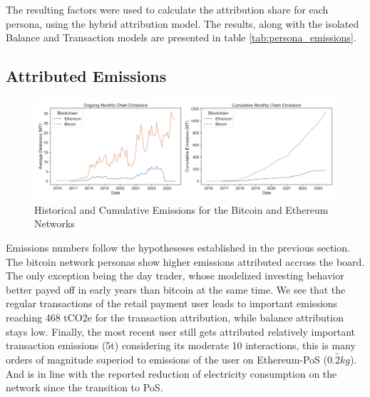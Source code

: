 \documentclass[11pt]{report}
\begin{document}
The resulting factors were used to calculate the attribution share for each persona, using the hybrid attribution model. The results, along with the isolated Balance and Transaction models are presented in table \ref{tab:persona_emissions}.

\subsection{Attributed Emissions}




\begin{figure}[h!]
    \centering
    \centerline{\includegraphics[scale=0.4]{figures/ongoing_cumulative_emissions.png}}
    \caption{Historical and Cumulative Emissions for the Bitcoin and Ethereum Networks}
    \label{fig:ongoing_emissions}
\end{figure}

Emissions numbers follow the hypotheseses established in the previous section. The bitcoin network personas show higher emissions attributed accross the board. The only exception being the day trader, whose modelized investing behavior better payed off in early years than bitcoin at the same time. We see that the regular transactions of the retail payment user leads to important emissions reaching 468 tCO2e for the transaction attribution, while balance attribution stays low. Finally, the most recent user still gets attributed relatively important transaction emissions (5t) considering its moderate 10 interactions, this is many orders of magnitude superiod to emissions of the user on Ethereum-PoS ($\tilde{0.2kg}$). And is in line with the reported reduction of electricity consumption on the network since the transition to PoS.
\end{document}
